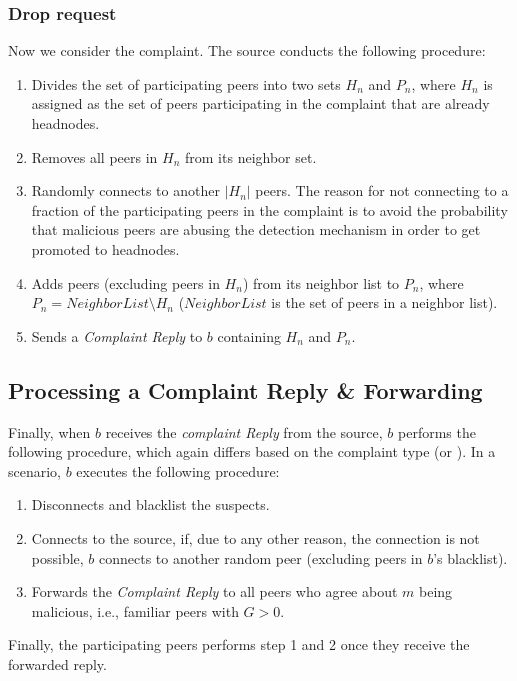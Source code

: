 \subsubsection*{Drop request}
Now we consider the \drop complaint. The source conducts the following procedure:
\begin{enumerate}
 \item Divides the set of participating peers into two sets $H_n$ and $P_n$, where $H_n$ is assigned as the set of peers participating in the complaint that are already headnodes. 
 \item Removes all peers in $H_n$ from its neighbor set.
 \item Randomly connects to another $|H_n|$ peers. 
 The reason for not connecting to a fraction of the participating peers in the complaint is to avoid the probability that malicious peers are abusing the detection mechanism in order to get promoted to headnodes.
 \item Adds peers (excluding peers in $H_n$) from its neighbor list to $P_n$, where $P_n = NeighborList\setminus H_n$ ($NeighborList$ is the set of peers in a neighbor list). 
 \item Sends a \textit{Complaint Reply} to $b$ containing $H_n$ and $P_n$.
\end{enumerate}

\subsection{Processing a Complaint Reply \& Forwarding}

Finally, when $b$ receives the \textit{complaint Reply} from the source, $b$ performs the following procedure,
which again differs based on the complaint type (\drop or \block).
In a \block scenario, $b$ executes the following procedure:
\begin{enumerate}
 \item Disconnects and blacklist the suspects.
 \item Connects to the source, if, due to any other reason, the connection is not possible, $b$ connects to another random peer (excluding peers in $b$'s blacklist).
 \item Forwards the \textit{Complaint Reply} to all peers who agree about $m$ being malicious, i.e., familiar peers with $G > 0$. 
\end{enumerate}
Finally, the participating peers performs step 1 and 2 once they receive the forwarded reply.

